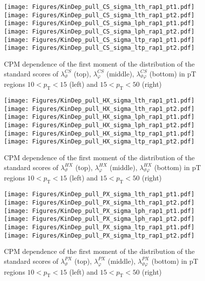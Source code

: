 \documentclass[12pt]{article}
\newcommand{\pT}{p_\mathrm{T}}
\newcommand{\lamthCS}{\lambda^{\scriptscriptstyle CS}_\vartheta}
\newcommand{\lamphCS}{\lambda^{\scriptscriptstyle CS}_\varphi}
\newcommand{\lamthphCS}{\lambda^{\scriptscriptstyle CS}_{\vartheta \varphi}}
\newcommand{\lamthHX}{\lambda^{\scriptscriptstyle HX}_\vartheta}
\newcommand{\lamphHX}{\lambda^{\scriptscriptstyle HX}_\varphi}
\newcommand{\lamthphHX}{\lambda^{\scriptscriptstyle HX}_{\vartheta \varphi}}
\newcommand{\lamthPX}{\lambda^{\scriptscriptstyle PX}_\vartheta}
\newcommand{\lamphPX}{\lambda^{\scriptscriptstyle PX}_\varphi}
\newcommand{\lamthphPX}{\lambda^{\scriptscriptstyle PX}_{\vartheta \varphi}}
\begin{document}
\begin{figure}[htbp]
\centering
\texttt{[image: Figures/KinDep\_pull\_CS\_sigma\_lth\_rap1\_pt1.pdf]}
\texttt{[image: Figures/KinDep\_pull\_CS\_sigma\_lth\_rap1\_pt2.pdf]}
\texttt{[image: Figures/KinDep\_pull\_CS\_sigma\_lph\_rap1\_pt1.pdf]}
\texttt{[image: Figures/KinDep\_pull\_CS\_sigma\_lph\_rap1\_pt2.pdf]}
\texttt{[image: Figures/KinDep\_pull\_CS\_sigma\_ltp\_rap1\_pt1.pdf]}
\texttt{[image: Figures/KinDep\_pull\_CS\_sigma\_ltp\_rap1\_pt2.pdf]}
\caption{CPM dependence of the first moment of the distribution of the
standard scores of $\lamthCS$ (top), $\lamphCS$ (middle), $\lamthphCS$ (bottom)
in pT regions $10<\pT<15$ (left) and $15<\pT<50$ (right)}
\end{figure}
\clearpage

\begin{figure}[htbp]
\centering
\texttt{[image: Figures/KinDep\_pull\_HX\_sigma\_lth\_rap1\_pt1.pdf]}
\texttt{[image: Figures/KinDep\_pull\_HX\_sigma\_lth\_rap1\_pt2.pdf]}
\texttt{[image: Figures/KinDep\_pull\_HX\_sigma\_lph\_rap1\_pt1.pdf]}
\texttt{[image: Figures/KinDep\_pull\_HX\_sigma\_lph\_rap1\_pt2.pdf]}
\texttt{[image: Figures/KinDep\_pull\_HX\_sigma\_ltp\_rap1\_pt1.pdf]}
\texttt{[image: Figures/KinDep\_pull\_HX\_sigma\_ltp\_rap1\_pt2.pdf]}
\caption{CPM dependence of the first moment of the distribution of the
standard scores of $\lamthHX$ (top), $\lamphHX$ (middle), $\lamthphHX$ (bottom)
in pT regions $10<\pT<15$ (left) and $15<\pT<50$ (right)}
\end{figure}
\clearpage

\begin{figure}[htbp]
\centering
\texttt{[image: Figures/KinDep\_pull\_PX\_sigma\_lth\_rap1\_pt1.pdf]}
\texttt{[image: Figures/KinDep\_pull\_PX\_sigma\_lth\_rap1\_pt2.pdf]}
\texttt{[image: Figures/KinDep\_pull\_PX\_sigma\_lph\_rap1\_pt1.pdf]}
\texttt{[image: Figures/KinDep\_pull\_PX\_sigma\_lph\_rap1\_pt2.pdf]}
\texttt{[image: Figures/KinDep\_pull\_PX\_sigma\_ltp\_rap1\_pt1.pdf]}
\texttt{[image: Figures/KinDep\_pull\_PX\_sigma\_ltp\_rap1\_pt2.pdf]}
\caption{CPM dependence of the first moment of the distribution of the
standard scores of $\lamthPX$ (top), $\lamphPX$ (middle), $\lamthphPX$ (bottom)
in pT regions $10<\pT<15$ (left) and $15<\pT<50$ (right)}
\end{figure}
\clearpage
\end{document}
